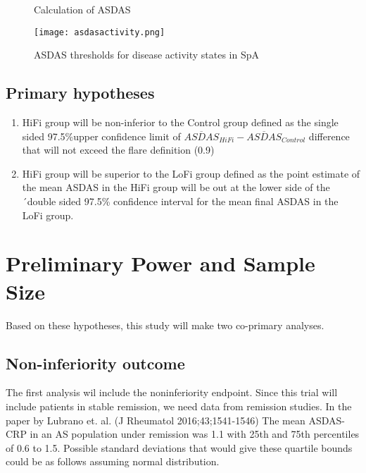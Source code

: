 \documentclass{article}\usepackage[]{graphicx}\usepackage[]{color}
\begin{document}
\begin{figure}
  \centering
  \caption {Calculation of ASDAS}
  \label{fig:asdas}
\end{figure}

\begin{figure}
  \centering
  \texttt{[image: asdasactivity.png]}
  \caption{ASDAS thresholds for disease activity states in SpA}
  \label{fig:asdasactivity}
\end{figure}

\subsection{Primary hypotheses}

\begin{enumerate}

\item HiFi group will be non-inferior to the Control group defined as the single sided 97.5\%upper confidence limit of  $\overline{ASDAS}_{HiFi} - \overline{ASDAS}_{Control}$ difference that will not exceed the flare definition (0.9)
\item HiFi group will be superior to the LoFi group defined as the point estimate of the mean ASDAS in the HiFi group will be out at the lower side of the ´double sided 97.5\% confidence interval for the mean final ASDAS in the LoFi group.

\end{enumerate}

\section{Preliminary Power and Sample Size}

Based on these hypotheses, this study will make two co-primary analyses.

\subsection{Non-inferiority outcome}

The first analysis wil include the noninferiority endpoint. Since this trial will include patients in stable remission, we need data from remission studies. In the paper by Lubrano et. al. (J Rheumatol 2016;43;1541-1546) The mean ASDAS-CRP in an AS population under remission was 1.1 with 25th and 75th percentiles of 0.6 to 1.5. Possible standard deviations that would give these quartile bounds could be as follows assuming normal distribution.
\end{document}
